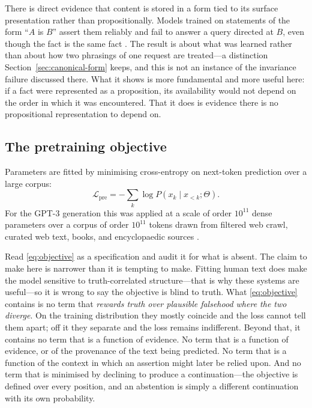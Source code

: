\documentclass[11pt]{article}
\theoremstyle{plain}
\theoremstyle{definition}
\begin{document}
There is direct evidence that content is stored in a form tied to its surface
presentation rather than propositionally. Models trained on statements of the form
``$A$ is $B$'' assert them reliably and fail to answer a query directed at $B$, even
though the fact is the same fact \citep{berglund2024}. The result is about what was
learned rather than about how two phrasings of one request are treated---a
distinction Section~\ref{sec:canonical-form} keeps, and this is not an instance of
the invariance failure discussed there. What it shows is more fundamental and more
useful here: if a fact were represented as a proposition, its availability would not
depend on the order in which it was encountered. That it does is evidence there is no
propositional representation to depend on.

\subsection{The pretraining objective}
\label{sec:pretraining}

Parameters are fitted by minimising cross-entropy on next-token prediction over a
large corpus:
\begin{equation}
  \mathcal{L}_{\mathrm{pre}}
  = -\sum_{k} \log P\!\left(x_k \mid x_{<k}; \Theta\right).
  \label{eq:objective}
\end{equation}
For the GPT-3 generation this was applied at a scale of order $10^{11}$ dense
parameters over a corpus of order $10^{11}$ tokens drawn from filtered web crawl,
curated web text, books, and encyclopaedic sources \citep{brown2020}.

Read \eqref{eq:objective} as a specification and audit it for what is absent. The
claim to make here is narrower than it is tempting to make. Fitting human text does
make the model sensitive to truth-correlated structure---that is why these systems are
useful---so it is wrong to say the objective is blind to truth. What
\eqref{eq:objective} contains is no term that \emph{rewards truth over plausible
falsehood where the two diverge}. On the training distribution they mostly coincide
and the loss cannot tell them apart; off it they separate and the loss remains
indifferent. Beyond that, it contains no term that is a function of evidence. No term that is a function of
evidence, or of the provenance of the text being predicted. No term that is a
function of the context in which an assertion might later be relied upon. And no
term that is minimised by declining to produce a continuation---the objective is
defined over every position, and an abstention is simply a different continuation
with its own probability.
\end{document}
